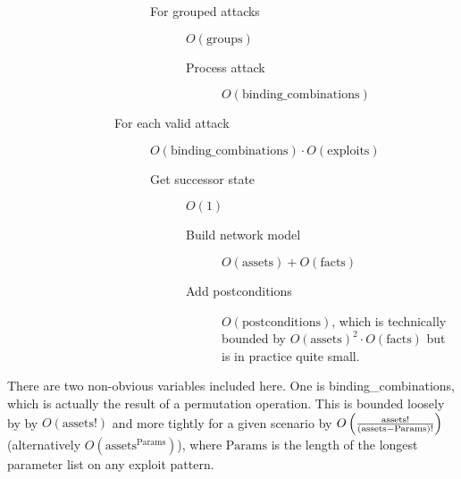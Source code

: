 \begin{description}
\begin{description}
\begin{description}
\begin{description}
\begin{description}
\begin{description}
                    \end{description}
                    \item[For grouped attacks] $O(\text{groups})$
                    \begin{description}
                        \item[Process attack] $O(\text{binding\_combinations})$
                    \end{description}
                \end{description}
                \item[For each valid attack] $O(\text{binding\_combinations}) \cdot O(\text{exploits})$
                \begin{description}
                    \item[Get successor state] $O(1)$
                    \begin{description}
                        \item[Build network model] $O(\text{assets}) + O(\text{facts})$
                        \item[Add postconditions] $O(\text{postconditions})$, which is
                            technically bounded by $O(\text{assets})^2 \cdot O(\text{facts})$
                            but is in practice quite small.
                    \end{description}
                \end{description}
            \end{description}
        \end{description}
    \end{description}
\end{description}
There are two non-obvious variables included here. One is binding\_combinations, which is
actually the result of a permutation operation. This is bounded loosely by
by $O(\text{assets}!)$ and more tightly for a given scenario by 
$O\left({\text{assets}! \over (\text{assets}-\text{Params})!}\right)$ (alternatively $O(\text{assets}^{\text{Params}})$),
where $\text{Params}$ is the length of the longest parameter list on any exploit pattern.

